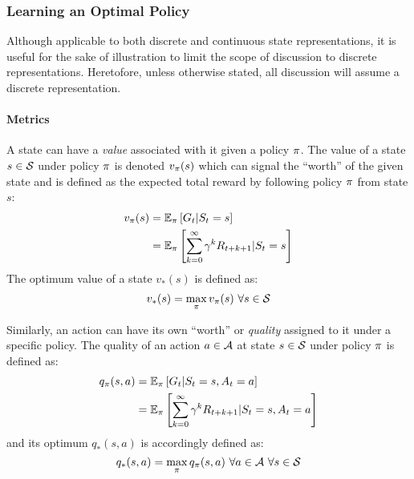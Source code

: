\subsubsection*{Learning an Optimal Policy}


%
Although applicable to both discrete and continuous state representations,
it is useful for the sake of illustration to limit the scope of discussion to
discrete representations.
%
Heretofore, unless otherwise stated, all discussion will assume a discrete
representation.


\paragraph*{Metrics}


A state can have a \textit{value} associated with it given a policy $\pi$.
%
The value of a state $s \in \mathcal{S}$ under policy $\pi$ is denoted
$v_\pi(s)$
which can signal the ``worth'' of the given state
and is defined as the expected total reward by following policy $\pi$ from
state $s$:
\begin{align*}
	v_\pi(s) &= \mathbb{E}_\pi\left[G_t | S_t = s\right] \\
		&= \mathbb{E}_\pi \left[
				\sum_{k=0}^{\infty} \gamma^k R_{t+k+1} | S_t = s
			\right]
\end{align*}
%
The optimum value of a state $v_*(s)$ is defined as:
\[ v_*(s) = \max_\pi v_\pi(s)\ \forall s \in \mathcal{S} \]

Similarly,
an action can have its own ``worth'' or \textit{quality} assigned to it under a
specific policy.
%
The quality of an action $a\in\mathcal{A}$ at state $s\in\mathcal{S}$ under policy
$\pi$ is defined as:
\begin{align*}
	q_\pi(s,a)
		&= \mathbb{E}_\pi\left[ G_t | S_t = s, A_t = a \right]
		\\
		&= \mathbb{E}_\pi\left[
				\sum_{k=0}^{\infty}\gamma^k R_{t+k+1} | S_t = s, A_t = a
			\right]
\end{align*}
and its optimum $q_*(s,a)$ is accordingly defined as:
\[
	q_*(s,a) = \max_{\policy}q_\policy(s,a)\ 
		\forall a\in\Actions\ \forall s\in\States
\]

